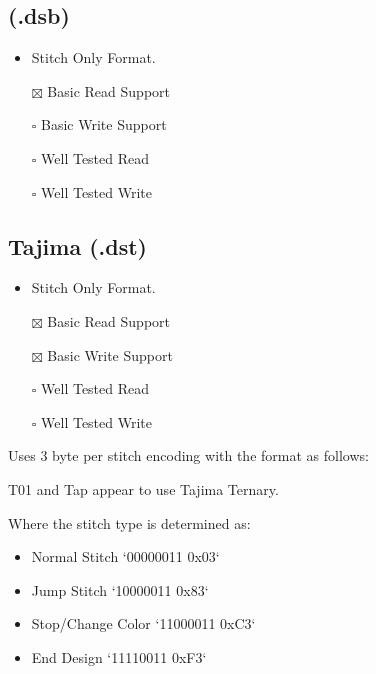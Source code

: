 \documentclass[onesize, a4paper]{refart}
\providecommand{\tightlist}{\setlength{\itemsep}{0pt}\setlength{\parskip}{0pt}}
\begin{document}
\hypertarget{dsb}{%
\subsection{(.dsb)}\label{dsb}}

\begin{itemize}
\tightlist
\item
  Stitch Only Format.
\item[$\boxtimes$]
  Basic Read Support
\item[$\square$]
  Basic Write Support
\item[$\square$]
  Well Tested Read
\item[$\square$]
  Well Tested Write
\end{itemize}

\subsection{Tajima (.dst)}

\begin{itemize}
\tightlist
\item Stitch Only Format.
\item[$\boxtimes$] Basic Read Support
\item[$\boxtimes$] Basic Write Support
\item[$\square$] Well Tested Read
\item[$\square$] Well Tested Write
\end{itemize}

Uses 3 byte per stitch encoding with the format as follows:


T01 and Tap appear to use Tajima Ternary.
 
Where the stitch type is determined as:

\begin{itemize}
\item Normal Stitch `00000011 0x03`
\item Jump Stitch `10000011 0x83`
\item Stop/Change Color `11000011 0xC3`
\item End Design `11110011 0xF3`
\end{itemize}
\end{document}
